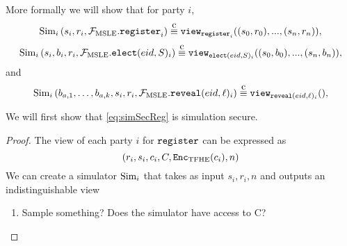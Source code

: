 More formally we will show that for party $i$,
\begin{equation}
	\label{eq:simSecReg}
	\simulator_i\left(s_i, r_i, \idealMSLE.\register_i\right) \compInd \texttt{view}_{\register_i}((s_0, r_0), ..., (s_n, r_n)),
\end{equation}
\begin{equation}
	\label{eq:simSecElect}
	\simulator_i\left(s_i, b_i, r_i, \idealMSLE.\elect_i\right) \compInd \texttt{view}_{\elect_i}((s_0, b_0), ..., (s_n, b_n)),
\end{equation}
and
\begin{equation}
	\label{eq:simSecReveal}
	\simulator_i\left(b_{a, 1}, \dots, b_{a, k}, s_i, r_i, \idealMSLE.\reveal_i\right) \compInd \texttt{view}_{\reveal_i}(),
\end{equation}

\begin{lemma}
	We will first show that \cref{eq:simSecReg} is simulation secure.
	\begin{proof}
		The view of each party $i$ for $\texttt{register}$ can be expressed as
		\begin{equation*}
			(r_i, s_i, c_i, C, \texttt{Enc}_{\mathrm{TFHE}}(c_i), n)
		\end{equation*}
		We can create a simulator $\text{Sim}_i$ that takes as input $s_i, r_i, n$ and outputs
		an indistinguishable view
		\begin{enumerate}
			\item Sample something? Does the simulator have access to C?
		\end{enumerate}
	\end{proof}
\end{lemma}


